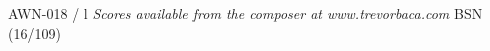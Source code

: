 \documentclass[11pt]{report}
\begin{document}
\null \vfill

AWN-018 / l \hfill
\textit{Scores available from the composer at www.trevorbaca.com}
\hfill BSN (16/109)
\end{document}
